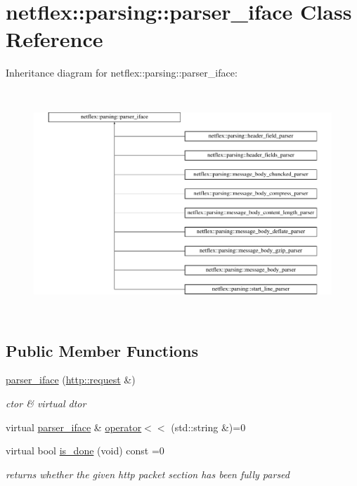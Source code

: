 \hypertarget{classnetflex_1_1parsing_1_1parser__iface}{}\section{netflex\+:\+:parsing\+:\+:parser\+\_\+iface Class Reference}
\label{classnetflex_1_1parsing_1_1parser__iface}
Inheritance diagram for netflex\+:\+:parsing\+:\+:parser\+\_\+iface\+:\begin{figure}[H]
\begin{center}
\leavevmode
\includegraphics[height=8.536586cm]{classnetflex_1_1parsing_1_1parser__iface}
\end{center}
\end{figure}
\subsection*{Public Member Functions}
\begin{DoxyCompactItemize}
\item 
\mbox{\label{classnetflex_1_1parsing_1_1parser__iface_aacba4e88059a0802b22c19b324bae9ec}} 
\hyperlink{classnetflex_1_1parsing_1_1parser__iface_aacba4e88059a0802b22c19b324bae9ec}{parser\+\_\+iface} (\hyperlink{classnetflex_1_1http_1_1request}{http\+::request} \&)
\begin{DoxyCompactList}\small\item\em ctor \& virtual dtor \end{DoxyCompactList}\item 
virtual \hyperlink{classnetflex_1_1parsing_1_1parser__iface}{parser\+\_\+iface} \& \hyperlink{classnetflex_1_1parsing_1_1parser__iface_ae41c581b5cb219fed4cf5fccf27011c3}{operator$<$$<$} (std\+::string \&)=0
\item 
\mbox{\label{classnetflex_1_1parsing_1_1parser__iface_afebd1cc50d5958f712dfac0c023fd162}} 
virtual bool \hyperlink{classnetflex_1_1parsing_1_1parser__iface_afebd1cc50d5958f712dfac0c023fd162}{is\+\_\+done} (void) const =0
\begin{DoxyCompactList}\small\item\em returns whether the given http packet section has been fully parsed \end{DoxyCompactList}\end{DoxyCompactItemize}
